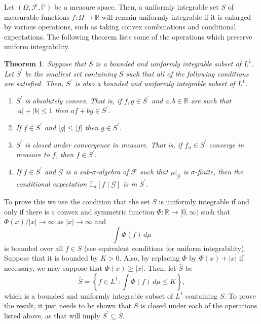 \documentclass[12pt]{article}
\newtheorem*{theorem*}{Theorem}
\begin{document}

Let $(\Omega,\mathcal{F},\mathbb{P})$ be a measure space. Then, a uniformly integrable set $S$ of measurable functions $f\colon\Omega\rightarrow\mathbb{R}$ will remain uniformly integrable if it is enlarged by various operations, such as taking convex combinations and conditional expectations. The following theorem lists some of the operations which preserve uniform integrability.

\begin{theorem*}
Suppose that $S$ is a bounded and uniformly integrable subset of $L^1$. Let $S^\prime$ be the smallest set containing $S$ such that all of the following conditions are satisfied. Then, $S^\prime$ is also a bounded and uniformly integrable subset of $L^1$.
\begin{enumerate}
\item $S^\prime$ is absolutely convex. That is, if $f,g\in S^\prime$ and $a,b\in\mathbb{R}$ are such that $|a|+|b|\le 1$ then $a f+b g\in S^\prime$.
\item If $f\in S^\prime$ and $|g|\le |f|$ then $g\in S^\prime$.
\item $S^\prime$ is closed under convergence in measure. That is, if $f_n\in S^\prime$ converge in measure to $f$, then $f\in S^\prime$.
\item If $f\in S^\prime$ and $\mathcal{G}$ is a sub-$\sigma$-algebra of $\mathcal{F}$ such that $\mu\vert_\mathcal{G}$ is $\sigma$-finite, then the conditional expectation $\mathbb{E}_\mu[f\mid\mathcal{G}]$ is in $S^\prime$.
\end{enumerate} 
\end{theorem*}

To prove this we use the condition that the set $S$ is uniformly integrable if and only if there is a convex and symmetric function $\Phi\colon\mathbb{R}\rightarrow[0,\infty)$ such that $\Phi(x)/|x|\rightarrow\infty$ as $|x|\rightarrow\infty$ and
\begin{equation*}
\int\Phi(f)\,d\mu
\end{equation*}
is bounded over all $f\in S$ (see equivalent conditions for uniform integrability). Suppose that it is bounded by $K>0$. Also, by replacing $\Phi$ by $\Phi(x)+|x|$ if necessary, we may suppose that $\Phi(x)\ge |x|$. Then, let $\bar S$ be
\begin{equation*}
\bar S=\left\{ f\in L^1:\int\Phi(f)\,d\mu\le K\right\},
\end{equation*}
which is a bounded and uniformly integrable subset of $L^1$ containing $S$. To prove the result, it just needs to be shown that $\bar S$ is closed under each of the operations listed above, as that will imply $S^\prime\subseteq\bar S$.
\end{document}

